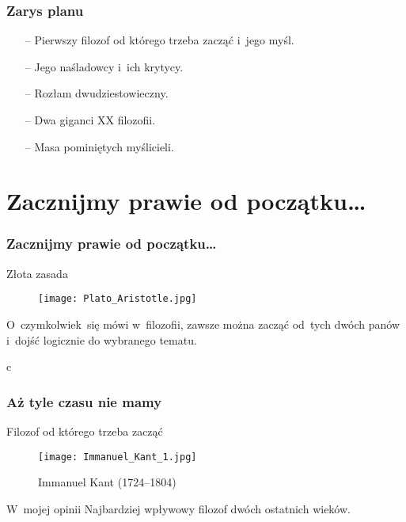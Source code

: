 \documentclass{beamer}  %
\begin{document}
\begin{frame}
  \frametitle{Zarys planu}

  \begin{block}{}
    \begin{itemize}
    \item[--] Pierwszy filozof od którego trzeba zacząć i~jego myśl.
    \item[--] Jego naśladowcy i~ich krytycy.
    \item[--] Rozłam dwudziestowieczny.
    \item[--] Dwa giganci XX filozofii.
    \item[--] Masa pominiętych myślicieli.
    \end{itemize}
  \end{block}

\end{frame}





\section[]{Zacznijmy prawie od początku\ldots}


\begin{frame}
  \frametitle{Zacznijmy prawie od początku\ldots}

  \begin{block}{Złota zasada}
    \begin{figure}
      \centering \texttt{[image: Plato\_Aristotle.jpg]} 
    \end{figure}
  \end{block}

  \begin{block}{}
    O~czymkolwiek~się mówi w~filozofii, zawsze można zacząć od~tych
    dwóch panów i~dojść logicznie do wybranego tematu.
  \end{block}
\end{frame}
c%



\begin{frame}
  \frametitle{Aż tyle czasu nie mamy}
  \pause

  \begin{block}{Filozof od którego trzeba zacząć}
    \begin{figure}
      \centering

      \texttt{[image: Immanuel\_Kant\_1.jpg]}
      \caption{Immanuel Kant (1724--1804)}
    \end{figure}
  \end{block}

  \begin{block}{W~mojej opinii}
    \pause Najbardziej wpływowy filozof dwóch ostatnich wieków.
  \end{block}

\end{frame}
\end{document}
